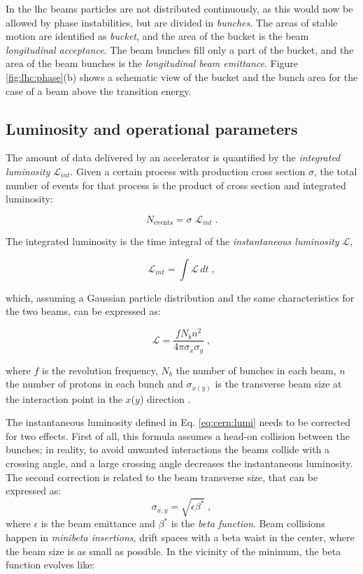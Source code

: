 In the \gls{lhc} beams particles are not distributed continuously, as this would now be allowed by phase instabilities, but are divided in \textit{bunches}. 
The areas of stable motion are identified as \textit{bucket}, and the area of the bucket is the beam \textit{longitudinal acceptance}. The beam bunches fill only a part of the bucket, and the area of the beam bunches is the \textit{longitudinal beam emittance}. Figure \ref{fig:lhc:phase}(b) shows a schematic view of the bucket and the bunch area for the case of a beam above the transition energy. 

\subsection{Luminosity and operational parameters}

The amount of data delivered by an accelerator is quantified by the \textit{integrated luminosity} $\mathcal{L}_{int}$.
Given a certain process with production cross section $\sigma$, the total number of events for that process is the product of cross section and integrated luminosity:

\begin{equation}
\label{eq:cern:nev}
N_{\mathrm{events}} = \sigma \,\, \mathcal{L}_{int} \; .
\end{equation}

The integrated luminosity is the time integral of the \textit{instantaneous luminosity} $\mathcal{L}$, 

\begin{equation}
\label{eq:cern:intlumi}
\mathcal{L}_{int} = \int \mathcal{L} \, dt \; ,
\end{equation}

\noindent which, assuming a Gaussian particle distribution and the same characteristics for the two beams, can be expressed as:

\begin{equation}
\mathcal{L}=\frac{f N_b n^2}{4 \pi \sigma_{x}\sigma_{y} } \; ,
\label{eq:cern:lumi}
\end{equation}

\noindent where $f$ is the revolution frequency, $N_b$ the number of bunches in each beam, $n$ the number of protons in each bunch and $\sigma_{x(y)}$  is the transverse beam size at the interaction point in the $x$($y$) direction . 

The instantaneous luminosity defined in Eq. \ref{eq:cern:lumi} needs to be corrected for two effects. First of all, this formula assumes a head-on collision between the bunches; in reality, to avoid unwanted interactions the beams collide with a crossing angle, and a large crossing angle decreases the instantaneous luminosity. The second correction is related to the beam transverse size, that can be expressed as:
\begin{equation}
\sigma_{x,y} = \sqrt{  \epsilon \beta^* } \; ,
\end{equation}
where $\epsilon$ is the beam emittance and $\beta^*$ is the \textit{beta function}. Beam collisions happen in \textit{minibeta insertions}, drift spaces with a beta waist in the center, where the beam size is as small as possible. In the vicinity of the minimum, the beta function evolves like:

